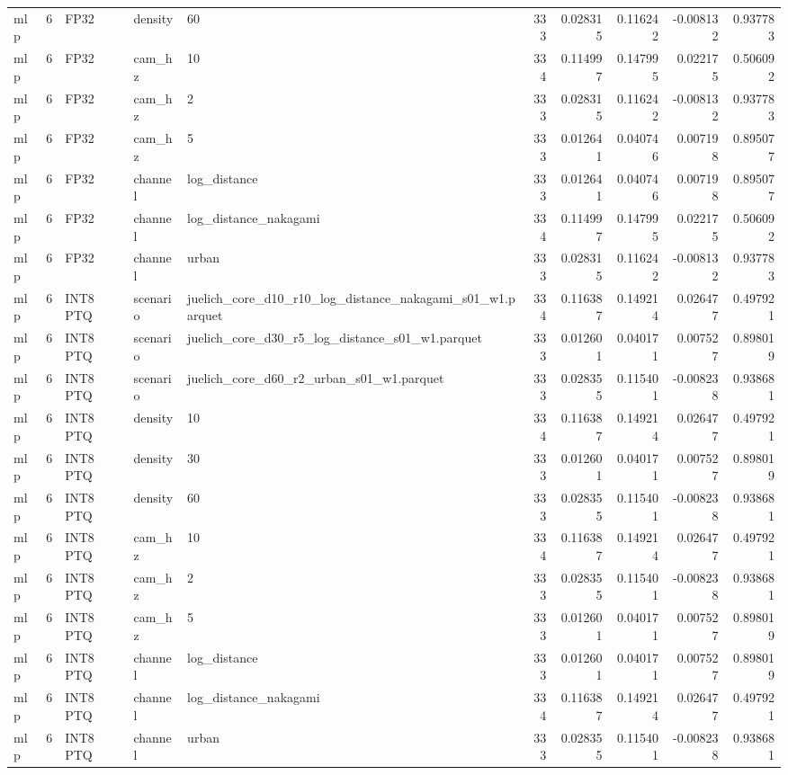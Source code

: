 \begin{tabular}{lrlllrrrrr}
mlp & 6 & FP32 & density & 60 & 333 & 0.028315 & 0.116242 & -0.008132 & 0.937783 \\
mlp & 6 & FP32 & cam\_hz & 10 & 334 & 0.114997 & 0.147995 & 0.022175 & 0.506092 \\
mlp & 6 & FP32 & cam\_hz & 2 & 333 & 0.028315 & 0.116242 & -0.008132 & 0.937783 \\
mlp & 6 & FP32 & cam\_hz & 5 & 333 & 0.012641 & 0.040746 & 0.007198 & 0.895077 \\
mlp & 6 & FP32 & channel & log\_distance & 333 & 0.012641 & 0.040746 & 0.007198 & 0.895077 \\
mlp & 6 & FP32 & channel & log\_distance\_nakagami & 334 & 0.114997 & 0.147995 & 0.022175 & 0.506092 \\
mlp & 6 & FP32 & channel & urban & 333 & 0.028315 & 0.116242 & -0.008132 & 0.937783 \\
mlp & 6 & INT8 PTQ & scenario & juelich\_core\_d10\_r10\_log\_distance\_nakagami\_s01\_w1.parquet & 334 & 0.116387 & 0.149214 & 0.026477 & 0.497921 \\
mlp & 6 & INT8 PTQ & scenario & juelich\_core\_d30\_r5\_log\_distance\_s01\_w1.parquet & 333 & 0.012601 & 0.040171 & 0.007527 & 0.898019 \\
mlp & 6 & INT8 PTQ & scenario & juelich\_core\_d60\_r2\_urban\_s01\_w1.parquet & 333 & 0.028355 & 0.115401 & -0.008238 & 0.938681 \\
mlp & 6 & INT8 PTQ & density & 10 & 334 & 0.116387 & 0.149214 & 0.026477 & 0.497921 \\
mlp & 6 & INT8 PTQ & density & 30 & 333 & 0.012601 & 0.040171 & 0.007527 & 0.898019 \\
mlp & 6 & INT8 PTQ & density & 60 & 333 & 0.028355 & 0.115401 & -0.008238 & 0.938681 \\
mlp & 6 & INT8 PTQ & cam\_hz & 10 & 334 & 0.116387 & 0.149214 & 0.026477 & 0.497921 \\
mlp & 6 & INT8 PTQ & cam\_hz & 2 & 333 & 0.028355 & 0.115401 & -0.008238 & 0.938681 \\
mlp & 6 & INT8 PTQ & cam\_hz & 5 & 333 & 0.012601 & 0.040171 & 0.007527 & 0.898019 \\
mlp & 6 & INT8 PTQ & channel & log\_distance & 333 & 0.012601 & 0.040171 & 0.007527 & 0.898019 \\
mlp & 6 & INT8 PTQ & channel & log\_distance\_nakagami & 334 & 0.116387 & 0.149214 & 0.026477 & 0.497921 \\
mlp & 6 & INT8 PTQ & channel & urban & 333 & 0.028355 & 0.115401 & -0.008238 & 0.938681 \\

\end{tabular}

